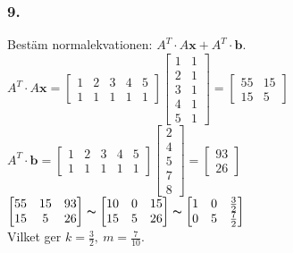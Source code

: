 \documentclass{article}
\begin{document}
\subsubsection*{9.}
Bestäm normalekvationen: $A^T\cdot A\mathbf{x}+A^T\cdot\mathbf{b}$.\\
$A^T\cdot A\mathbf{x}=\begin{bmatrix}1&2&3&4&5\\1&1&1&1&1\end{bmatrix}\begin{bmatrix}1&1\\2&1\\3&1\\4&1\\5&1\end{bmatrix}=\begin{bmatrix}55&15\\15&5\end{bmatrix}$\\
$A^T\cdot\mathbf{b}=\begin{bmatrix}1&2&3&4&5\\1&1&1&1&1\end{bmatrix}\begin{bmatrix}2\\4\\5\\7\\8\end{bmatrix}=\begin{bmatrix}93\\26\end{bmatrix}$
$\begin{bmatrix}55&15&93\\15&5&26\end{bmatrix}\thicksim\begin{bmatrix}10&0&15\\15&5&26\end{bmatrix}\thicksim\begin{bmatrix}1&0&\frac{3}{2}\\0&5&\frac{7}{2}\end{bmatrix}$\\
Vilket ger $k=\frac{3}{2},\ m=\frac{7}{10}$.
\end{document}
